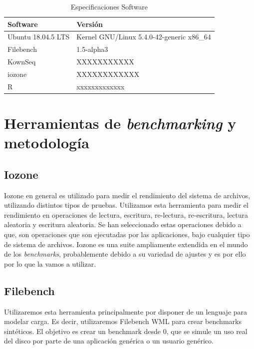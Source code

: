 \begin{table}[H]
    \centering
    \begin{tabular}{|l|l|}
    \hline
        Software & Versión \\ \hline\hline
        Ubuntu 18.04.5 LTS & Kernel GNU/Linux 5.4.0-42-generic x86\_64 \\ \hline
        Filebench & 1.5-alpha3 \\ \hline
        KownSeq & XXXXXXXXXXX \\ \hline
        iozone & XXXXXXXXXXXX \\ \hline
        R & xxxxxxxxxxxxx \\ \hline
    \end{tabular}
    \caption{Especificaciones Software}
\label{table:2}
\end{table}



\section{Herramientas de \textit{benchmarking} y metodología}
\subsection{Iozone}
Iozone en general es utilizado para medir el rendimiento del sistema de archivos, utilizando distintos tipos de pruebas. Utilizamos esta herramienta para medir el rendimiento en operaciones de lectura, escritura, re-lectura, re-escritura, lectura aleatoria y escritura aleatoria. Se han seleccionado estas operaciones debido a que, son operaciones que son ejecutadas por las aplicaciones, bajo cualquier tipo de sistema de archivos. Iozone es una suite ampliamente extendida en el mundo de los \textit{benchmarks}, probablemente debido a su variedad de ajustes y es por ello por lo que la vamos a utilizar.

\subsection{Filebench}
Utilizaremos esta herramienta principalmente por disponer de un lenguaje para modelar carga. Es decir, utilizaremos Filebench WML para crear benchmarks sintéticos. El objetivo es crear un benchmark desde 0, que se simule un uso real del disco por parte de una aplicación genérica o un usuario genérico. 

